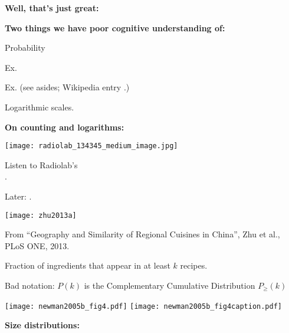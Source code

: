   \textbf{Well, that's just great:}

  \textbf{Two things we have poor cognitive understanding of:}
    
     
      Probability
      
       
        Ex. 
      
        Ex.  \newline
        {\small(see asides; Wikipedia entry .)}
      
      
      Logarithmic scales.
    
  

  \textbf{On counting and logarithms:}
                
            
      \texttt{[image: radiolab\_134345\_medium\_image.jpg]}
      
      
       
        Listen to Radiolab's\\ 
        .
       
        Later: .
      
      
      
  

  \texttt{[image: zhu2013a]}

  
   
    From ``Geography and Similarity of Regional Cuisines in China''\cite{zhu2013a},
    Zhu et al., PLoS ONE, 2013.
   
    Fraction of ingredients that appear in at least $k$ recipes.
   
    Bad notation: $P(k)$ is the Complementary Cumulative Distribution $P_{\ge}(k)$ 
  




  
    \texttt{[image: newman2005b\_fig4.pdf]}
    \texttt{[image: newman2005b\_fig4caption.pdf]}
  


  \textbf{Size distributions:}

